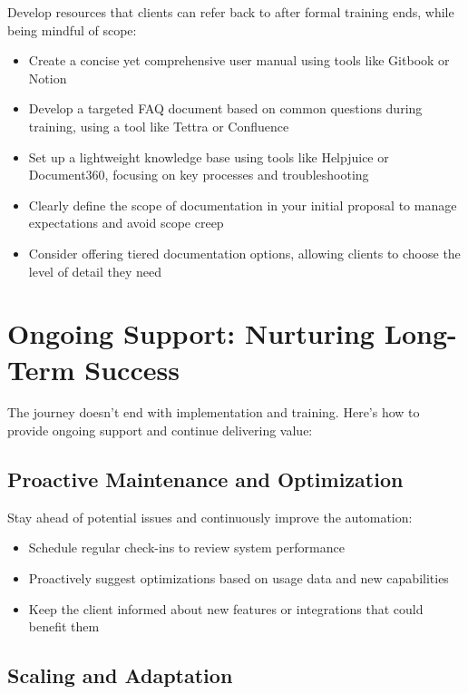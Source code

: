 Develop resources that clients can refer back to after formal training ends, while being mindful of scope:

\begin{itemize}
    \item Create a concise yet comprehensive user manual using tools like Gitbook or Notion
    \item Develop a targeted FAQ document based on common questions during training, using a tool like Tettra or Confluence
    \item Set up a lightweight knowledge base using tools like Helpjuice or Document360, focusing on key processes and troubleshooting
    \item Clearly define the scope of documentation in your initial proposal to manage expectations and avoid scope creep
    \item Consider offering tiered documentation options, allowing clients to choose the level of detail they need
\end{itemize}


\section{Ongoing Support: Nurturing Long-Term Success}

The journey doesn't end with implementation and training. Here's how to provide ongoing support and continue delivering value:

\subsection{Proactive Maintenance and Optimization}

Stay ahead of potential issues and continuously improve the automation:

\begin{itemize}
    \item Schedule regular check-ins to review system performance
    \item Proactively suggest optimizations based on usage data and new capabilities
    \item Keep the client informed about new features or integrations that could benefit them
\end{itemize}

\subsection{Scaling and Adaptation}

